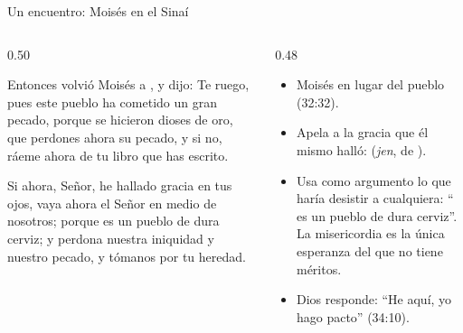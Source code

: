 \begin{frame}{Un encuentro: Moisés en el Sinaí}
\begin{columns}[t,onlytextwidth]
\begin{column}{0.50\textwidth}
\begin{cita}Entonces volvió Moisés a \SENOR, y dijo: Te ruego, pues este pueblo ha cometido un gran pecado, porque se hicieron dioses de oro, que perdones ahora su pecado, y si no, ráeme ahora de tu libro que has escrito.\end{cita}
\begin{cita}Si ahora, Señor, he hallado gracia en tus ojos, vaya ahora el Señor en medio de nosotros; porque es un pueblo de dura cerviz; y perdona nuestra iniquidad y nuestro pecado, y tómanos por tu heredad.\end{cita}
\end{column}
\begin{column}{0.48\textwidth}\small
\begin{itemize}
\item Moisés  en lugar del pueblo (32:32).
\item Apela a la gracia que él mismo halló:  (\emph{jen}, de ).
\item Usa como argumento lo que haría desistir a cualquiera: `` es un pueblo de dura cerviz''. La misericordia es la única esperanza del que no tiene méritos.
\item Dios responde: ``He aquí, yo hago pacto'' (34:10).
\end{itemize}
\end{column}
\end{columns}
\end{frame}

